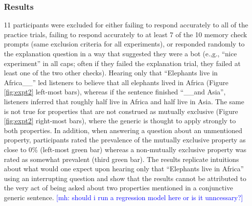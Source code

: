 \documentclass[10pt,letterpaper]{article}
\newcommand{\mh}[1]{{\textcolor{Blue}{[mh: #1]}}}
\begin{document}







\subsubsection{Results}





11 participants were excluded for either failing to respond accurately to all of the practice trials, failing to respond accurately to at least 7 of the 10 memory check prompts (same exclusion criteria for all experiments), or responded randomly to the explanation question in a way that suggested they were a bot (e.,g., ``nice experiment'' in all caps; often if they failed the explanation trial, they failed at least one of the two other checks). 
Hearing only that ``Elephants live in Africa\_\_'' led listeners to believe that all elephants lived in Africa (Figure \ref{fig:expt2} left-most bars), whereas if the sentence finished ``\_\_and Asia'', listeners inferred that roughly half live in Africa and half live in Asia. 
The same is not true for properties that are not construed as mutually exclusive (Figure \ref{fig:expt2} right-most bars), where the generic is thought to apply strongly to both properties. 
In addition, when answering a question about an unmentioned property, participants rated the prevalence of the mutually exclusive property as close to 0\% (left-most green bar) whereas a non-mutually exclusive property was rated as somewhat prevalent (third green bar).
The results replicate intuitions about what would one expect upon hearing only that ``Elephants live in Africa'' using an interrupting question and show that the results cannot be attributed to the very act of being asked about two properties mentioned in a conjunctive generic sentence.
\mh{should i run a regression model here or is it unncessary?}
\end{document}
